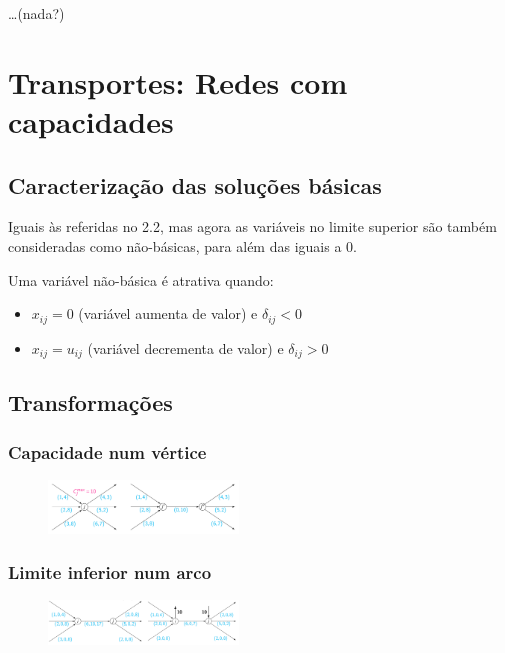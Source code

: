 \documentclass[10pt, a4paper]{article}
\begin{document}
\begin{multicols}{2}
\dots (nada?)

\section{Transportes: Redes com capacidades}

\subsection{Caracterização das soluções básicas}

Iguais às referidas no 2.2, mas agora as variáveis no limite superior são também consideradas como não-básicas, para além das iguais a 0.

Uma variável não-básica é atrativa quando:
\begin{itemize}
    \item \(x_{ij} = 0\) (variável aumenta de valor) e \(\delta_{ij} < 0\)
    \item \(x_{ij} = u_{ij}\) (variável decrementa de valor) e \(\delta_{ij} > 0\)
\end{itemize}

\subsection{Transformações}

\subsubsection{Capacidade num vértice}

\begin{figure}[H]
    \centering
    \includegraphics[width=0.45\textwidth]{cap_vertice.png}
\end{figure}

\subsubsection{Limite inferior num arco}

\begin{figure}[H]
    \centering
    \includegraphics[width=0.45\textwidth]{limites.png}
\end{figure}



\end{multicols}
\end{document}
